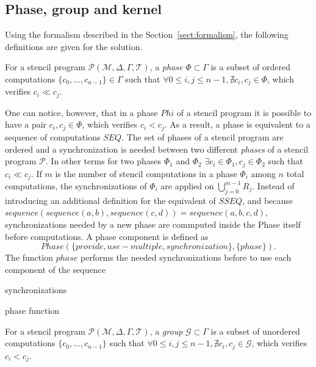 \subsection{Phase, group and kernel}
Using the formalism described in the Section~\ref{sect:formalism}, the following definitions are given for the solution.

\medskip
\begin{mydef}
For a stencil program $\mathcal{P}(\mathcal{M},\Delta,\Gamma,\mathcal{T})$, a \emph{phase} $\Phi \subset \Gamma$ is a subset of ordered computations $\{c_0,...,c_{n-1}\} \in \Gamma$ such that $\forall 0 \leq i,j \leq n-1, \nexists c_i,c_j \in \Phi$, which verifies $c_i \ll c_j$.
\end{mydef}

One can notice, however, that in a phase $Phi$ of a stencil program it is possible to have a pair $c_i,c_j \in \Phi$, which verifies $c_i<c_j$. As a result, a phase is equivalent to a sequence of computations $SEQ$. The set of phases of a stencil program are ordered and a synchronization is needed between two different \emph{phases} of a stencil program $\mathcal{P}$. In other terms for two phases $\Phi_1$ and $\Phi_2$ $\exists c_i \in \Phi_1, c_j \in \Phi_2$ such that $c_i \ll c_j$. If $m$ is the number of stencil computations in a phase $\Phi_i$ among $n$ total computations, the synchronizations of $\Phi_i$ are applied on $\bigcup_{j=0}^{m-1}R_j$. Instead of introducing an additional definition for the equivalent of $SSEQ$, and because $sequence(sequence(a,b),sequence(c,d))=sequence(a,b,c,d)$, synchronizations needed by a new phase are commputed inside the Phase itself before computations. A phase component is defined as
\begin{equation}
Phase(\{provide,use-multiple, synchronization\},\{phase\}).
\end{equation}
 The function $phase$ performs the needed synchronizations before to use each component of the sequence

\begin{algorithm}[H]
 synchronizations\\
 \caption{phase function}
 \end{algorithm}

\begin{mydef}
For a stencil program $\mathcal{P}(\mathcal{M},\Delta,\Gamma,\mathcal{T})$, a \emph{group} $\mathcal{G} \subset \Gamma$ is a subset of unordered computations $\{c_0,...,c_{n-1}\}$ such that $\forall 0 \leq i,j \leq n-1, \nexists c_i,c_j \in \mathcal{G}$, which verifies $c_i<c_j$.
\end{mydef}

